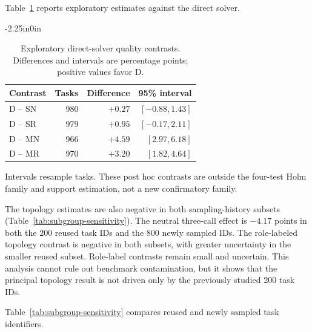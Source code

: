 \documentclass[10pt,letterpaper]{article}
\begin{document}
Table~\ref{tab:direct-contrasts} reports exploratory estimates against the direct solver.

\FloatBarrier
\begin{table}[!ht]
\begin{adjustwidth}{-2.25in}{0in}
\caption{Exploratory direct-solver quality contrasts. Differences and intervals are percentage points; positive values favor D.}
\label{tab:direct-contrasts}
\centering\small
\begin{tabular}{@{}lrrr@{}}
\toprule
Contrast & Tasks & Difference & 95\% interval\\
\midrule
D -- SN & 980 & $+0.27$ & $[-0.88, 1.43]$\\
D -- SR & 979 & $+0.95$ & $[-0.17, 2.11]$\\
D -- MN & 966 & $+4.59$ & $[2.97, 6.18]$\\
D -- MR & 970 & $+3.20$ & $[1.82, 4.64]$\\
\bottomrule
\end{tabular}
\par\smallskip\noindent Intervals resample tasks. These post hoc contrasts are outside the four-test Holm family and support estimation, not a new confirmatory family.
\end{adjustwidth}
\end{table}
\FloatBarrier


The topology estimates are also negative in both sampling-history subsets (Table~\ref{tab:subgroup-sensitivity}). The neutral three-call effect is $-4.17$ points in both the 200 reused task IDs and the 800 newly sampled IDs. The role-labeled topology contrast is negative in both subsets, with greater uncertainty in the smaller reused subset. Role-label contrasts remain small and uncertain. This analysis cannot rule out benchmark contamination, but it shows that the principal topology result is not driven only by the previously studied 200 task IDs.

Table~\ref{tab:subgroup-sensitivity} compares reused and newly sampled task identifiers.
\end{document}
